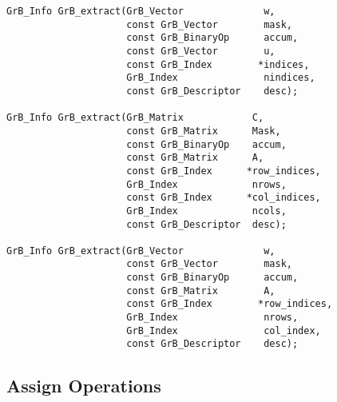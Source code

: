 \documentclass[11pt]{article}
\begin{document}
\begin{verbatim}
GrB_Info GrB_extract(GrB_Vector              w,
                     const GrB_Vector        mask,
                     const GrB_BinaryOp      accum,
                     const GrB_Vector        u,
                     const GrB_Index        *indices,
                     GrB_Index               nindices,
                     const GrB_Descriptor    desc);

GrB_Info GrB_extract(GrB_Matrix            C,
                     const GrB_Matrix      Mask,
                     const GrB_BinaryOp    accum,
                     const GrB_Matrix      A,
                     const GrB_Index      *row_indices,
                     GrB_Index             nrows,
                     const GrB_Index      *col_indices,
                     GrB_Index             ncols,
                     const GrB_Descriptor  desc);

GrB_Info GrB_extract(GrB_Vector              w,
                     const GrB_Vector        mask,
                     const GrB_BinaryOp      accum,
                     const GrB_Matrix        A,
                     const GrB_Index        *row_indices,
                     GrB_Index               nrows,
                     GrB_Index               col_index,
                     const GrB_Descriptor    desc);
\end{verbatim}

\subsection{Assign Operations}
\end{document}

